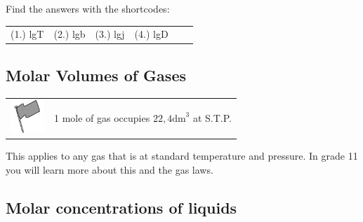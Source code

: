       

    
    \label{m38712*cid7}
\par {} Find the answers with the shortcodes:
 \par \begin{tabular}[h]{cccccc}
 (1.) lgT  &  (2.) lgb  &  (3.) lgj  &  (4.) lgD  & \end{tabular}



            \subsection{ Molar Volumes of Gases}
            \nopagebreak
            \par
            \label{m38712*eip-id1168064596799}\begin{definition}
	  \begin{tabular*}{15 cm}{m{15 mm}m{}}
	\hspace*{-50pt}  \includegraphics[width=0.5in]{col11305.imgs/psflag2.png}   & \Definition{   \label{id2504818}\textbf{Molar volume of gases}} { \label{m38712*eip-id1168053572222}1 mole of gas occupies \begin{math}22,4{\mathrm{dm}}^{3}\end{math} at S.T.P. } 
      \end{tabular*}
      \end{definition}

      \label{m38712*id282112}This applies to any gas that is at standard temperature and pressure. In grade 11 you will learn more about this and the gas laws.\par 
      



    
    \label{m38712*cid8}
            \subsection{ Molar concentrations of liquids}
            \nopagebreak
            
